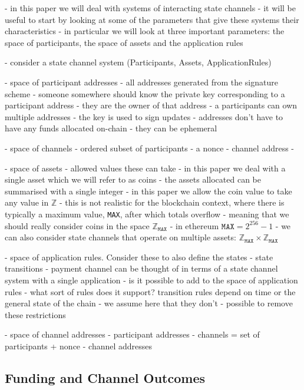 \documentclass{article}
\theoremstyle{definition}
\begin{document}
- in this paper we will deal with systems of interacting state channels
- it will be useful to start by looking at some of the parameters that give these
   systems their characteristics
- in particular we will look at three important parameters: the space of participants,
  the space of assets and the application rules

- consider a state channel system (Participants, Assets, ApplicationRules)

- space of participant addresses
- all addresses generated from the signature scheme
- someone somewhere should know the private key corresponding to a participant address
- they are the owner of that address
- a participants can own multiple addresses
- the key is used to sign updates
- addresses don't have to have any funds allocated on-chain - they can be ephemeral

- space of channels
- ordered subset of participants
- a nonce
- channel address
- 

- space of assets
- allowed values these can take
- in this paper we deal with a single asset which we will refer to as coins
- the assets allocated can be summarised with a single integer
- in this paper we allow the coin value to take any value in $\mathbb{Z}$
- this is not realistic for the blockchain context, where there is typically a maximum
  value, \texttt{MAX}, after which totals overflow
- meaning that we should really consider coins in the space $\mathbb{Z}_{\texttt{MAX}}$
- in ethereum $\texttt{MAX} = 2^{256} - 1$
- we can also consider state channels that operate on multiple assets: $\mathbb{Z}_{\texttt{MAX}} \times \mathbb{Z}_{\texttt{MAX}}$

- space of application rules. Consider these to also define the states
- state transitions
- payment channel can be thought of in terms of a state channel system with a single application
- is it possible to add to the space of application rules
- what sort of rules does it support? transition rules depend on time or the general state of the chain
- we assume here that they don't
- possible to remove these restrictions



- space of channel addresses
- participant addresses
- channels = set of participants + nonce
- channel addresses

\subsection{Funding and Channel Outcomes}
\end{document}
